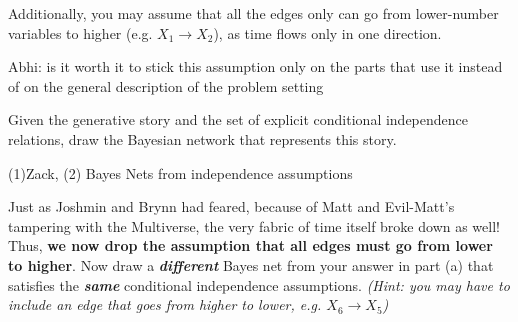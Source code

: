 \begin{parts}
Additionally, you may assume that all the edges only can go from lower-number variables to higher (e.g. $X_1 \rightarrow X_2$), as time flows only in one direction.

\begin{qauthor}
    Abhi: is it worth it to stick this assumption only on the parts that use it instead of on the general description of the problem setting
\end{qauthor}

\begin{subparts}
\subpart[3] Given the generative story and the set of explicit conditional independence relations, draw the Bayesian network that represents this story.
\begin{tcolorbox}[fit,height=10cm, width=15cm, blank, borderline={1pt}{-2pt}]
    
\end{tcolorbox}
\begin{soln}
\end{soln}
\begin{qauthor}
    (1)Zack, (2) Bayes Nets from independence assumptions
\end{qauthor}



\subpart[3] Just as Joshmin and Brynn had feared, because of Matt and Evil-Matt's tampering with the Multiverse, the very fabric of time itself broke down as well! Thus, \textbf{we now drop the assumption that all edges must go from lower to higher}. Now draw a \textit{\textbf{different}} Bayes net from your answer in part (a) that satisfies the \textit{\textbf{same}} conditional independence assumptions. \textit{(Hint: you may have to include an edge that goes from higher to lower, e.g. $X_6 \rightarrow X_5$)}
\begin{tcolorbox}[fit,height=10cm, width=15cm, blank, borderline={1pt}{-2pt}]
    

\end{tcolorbox}
\end{subparts}
\end{parts}
